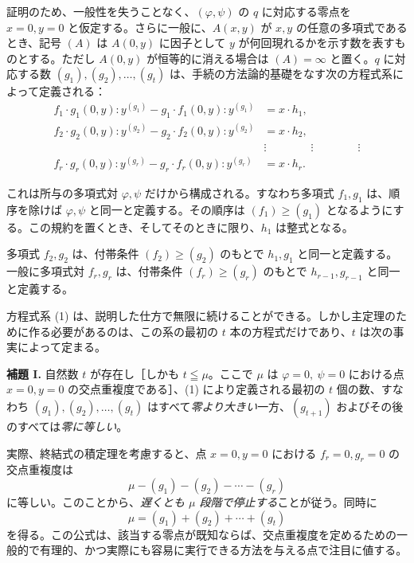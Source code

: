 証明のため、一般性を失うことなく、\((\varphi,\psi)\) の \(q\) に対応する零点を \(x=0, y=0\) と仮定する。さらに一般に、\(A(x,y)\) が \(x,y\) の任意の多項式であるとき、記号 \((A)\) は \(A(0,y)\) に因子として \(y\) が何回現れるかを示す数を表すものとする。ただし \(A(0,y)\) が恒等的に消える場合は \((A)=\infty\) と置く。\(q\) に対応する数 \((g_1),(g_2),\ldots,(g_t)\) は、手続の方法論的基礎をなす次の方程式系によって定義される：
\begin{equation}
\tag{1}
\begin{aligned}
f_1\cdot g_1(0,y):y^{(g_1)}-g_1\cdot f_1(0,y):y^{(g_1)}&=x\cdot h_1,\\
f_2\cdot g_2(0,y):y^{(g_2)}-g_2\cdot f_2(0,y):y^{(g_2)}&=x\cdot h_2,\\
&\vdots \qquad\qquad\vdots\qquad\qquad\vdots\\
f_r\cdot g_r(0,y):y^{(g_r)}-g_r\cdot f_r(0,y):y^{(g_r)}&=x\cdot h_r.
\end{aligned}
\end{equation}

これは所与の多項式対 \(\varphi,\psi\) だけから構成される。すなわち多項式 \(f_1,g_1\) は、順序を除けば \(\varphi,\psi\) と同一と定義する。その順序は \((f_1)\geq(g_1)\) となるようにする。この規約を置くとき、そしてそのときに限り、\(h_1\) は整式となる。

多項式 \(f_2,g_2\) は、付帯条件 \((f_2)\geq(g_2)\) のもとで \(h_1,g_1\) と同一と定義する。一般に多項式対 \(f_r,g_r\) は、付帯条件 \((f_r)\geq(g_r)\) のもとで \(h_{r-1},g_{r-1}\) と同一と定義する。

方程式系 (1) は、説明した仕方で無限に続けることができる。しかし主定理のために作る必要があるのは、この系の最初の \(t\) 本の方程式だけであり、\(t\) は次の事実によって定まる。

\textbf{補題 I.} 自然数 \(t\) が存在し［しかも \(t\leqq\mu\)。ここで \(\mu\) は \(\varphi=0,\ \psi=0\) における点 \(x=0, y=0\) の交点重複度である］、(1) により定義される最初の \(t\) 個の数、すなわち \((g_1),(g_2),\ldots,(g_t)\) はすべて\emph{零より大きい}一方、\((g_{t+1})\) およびその後のすべては\emph{零に等しい}。

実際、終結式の積定理を考慮すると、点 \(x=0, y=0\) における \(f_r=0, g_r=0\) の交点重複度は
\[
\mu-(g_1)-(g_2)-\cdots-(g_r)
\]
に等しい。このことから、\emph{遅くとも \(\mu\) 段階で停止する}ことが従う。同時に
\begin{equation}
\tag{2}
\mu=(g_1)+(g_2)+\cdots+(g_t)
\end{equation}
を得る。この公式は、該当する零点が既知ならば、交点重複度を定めるための一般的で有理的、かつ実際にも容易に実行できる方法を与える点で注目に値する。

